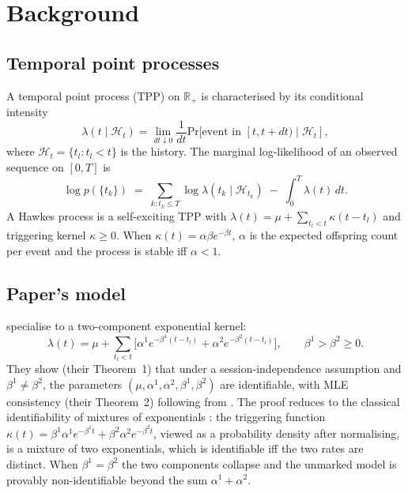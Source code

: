 \documentclass[11pt]{article}
\theoremstyle{remark}
\newcommand{\RR}{\mathbb{R}}
\newcommand{\Prob}{\mathrm{Pr}}
\begin{document}
\section{Background}
\label{sec:background}

\subsection{Temporal point processes}
A temporal point process (TPP) on $\RR_+$ is characterised by its conditional intensity
\begin{equation*}
\lambda(t \mid \mathcal{H}_t) = \lim_{dt \downarrow 0} \frac{1}{dt} \Prob[\text{event in }[t, t+dt) \mid \mathcal{H}_t],
\end{equation*}
where $\mathcal{H}_t = \{t_l : t_l < t\}$ is the history. The marginal log-likelihood of an observed sequence on $[0, T]$ is
\begin{equation*}
\log p(\{t_k\}) \;=\; \sum_{k : t_k \le T} \log \lambda(t_k \mid \mathcal{H}_{t_k}) \;-\; \int_0^T \lambda(t) \, dt.
\end{equation*}
A Hawkes process is a self-exciting TPP with $\lambda(t) = \mu + \sum_{t_l < t} \kappa(t - t_l)$ and triggering kernel $\kappa \ge 0$. When $\kappa(t) = \alpha \beta e^{-\beta t}$, $\alpha$ is the expected offspring count per event and the process is stable iff $\alpha < 1$.

\subsection{Paper's model}
\citet{agarwal2024system2} specialise to a two-component exponential kernel:
\begin{equation}
\lambda(t) = \mu + \sum_{t_l < t}\Big[\alpha^1 e^{-\beta^1(t-t_l)} + \alpha^2 e^{-\beta^2(t-t_l)}\Big], \qquad \beta^1 > \beta^2 \ge 0. \label{eq:paper-intensity}
\end{equation}
They show (their Theorem~1) that under a session-independence assumption and $\beta^1 \ne \beta^2$, the parameters $(\mu, \alpha^1, \alpha^2, \beta^1, \beta^2)$ are identifiable, with MLE consistency (their Theorem~2) following from \citet{gao2018consistency}. The proof reduces to the classical identifiability of mixtures of exponentials \citep{teicher1961mixtures}: the triggering function $\kappa(t) = \beta^1 \alpha^1 e^{-\beta^1 t} + \beta^2 \alpha^2 e^{-\beta^2 t}$, viewed as a probability density after normalising, is a mixture of two exponentials, which is identifiable iff the two rates are distinct. When $\beta^1 = \beta^2$ the two components collapse and the unmarked model is provably non-identifiable beyond the sum $\alpha^1 + \alpha^2$.
\end{document}
